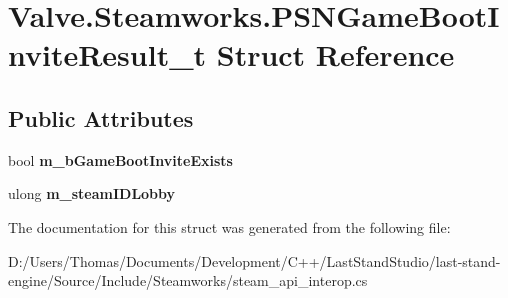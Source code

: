 \hypertarget{structValve_1_1Steamworks_1_1PSNGameBootInviteResult__t}{}\section{Valve.\+Steamworks.\+P\+S\+N\+Game\+Boot\+Invite\+Result\+\_\+t Struct Reference}
\label{structValve_1_1Steamworks_1_1PSNGameBootInviteResult__t}
\subsection*{Public Attributes}
\begin{DoxyCompactItemize}
\item 
\hypertarget{structValve_1_1Steamworks_1_1PSNGameBootInviteResult__t_af492b14f21fe1248da943d6c32e99f0d}{}bool {\bfseries m\+\_\+b\+Game\+Boot\+Invite\+Exists}\label{structValve_1_1Steamworks_1_1PSNGameBootInviteResult__t_af492b14f21fe1248da943d6c32e99f0d}

\item 
\hypertarget{structValve_1_1Steamworks_1_1PSNGameBootInviteResult__t_a4fcba786c75bb16dc76ec1136f309c41}{}ulong {\bfseries m\+\_\+steam\+I\+D\+Lobby}\label{structValve_1_1Steamworks_1_1PSNGameBootInviteResult__t_a4fcba786c75bb16dc76ec1136f309c41}

\end{DoxyCompactItemize}


The documentation for this struct was generated from the following file\+:\begin{DoxyCompactItemize}
\item 
D\+:/\+Users/\+Thomas/\+Documents/\+Development/\+C++/\+Last\+Stand\+Studio/last-\/stand-\/engine/\+Source/\+Include/\+Steamworks/steam\+\_\+api\+\_\+interop.\+cs\end{DoxyCompactItemize}
